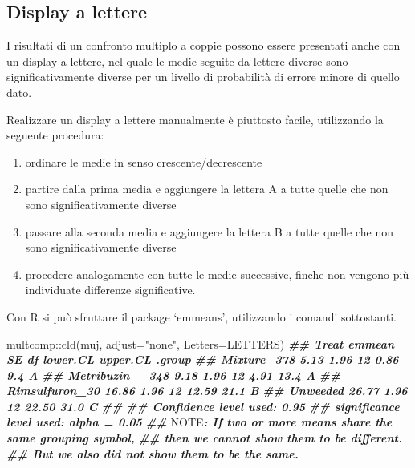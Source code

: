 \documentclass[
  12pt,
]{book}
\newenvironment{Shaded}{\begin{snugshade}}{\end{snugshade}}
\newcommand{\AlertTok}[1]{\textcolor[rgb]{0.94,0.16,0.16}{#1}}
\newcommand{\AttributeTok}[1]{\textcolor[rgb]{0.77,0.63,0.00}{#1}}
\newcommand{\DocumentationTok}[1]{\textcolor[rgb]{0.56,0.35,0.01}{\textbf{\textit{#1}}}}
\newcommand{\FunctionTok}[1]{\textcolor[rgb]{0.00,0.00,0.00}{#1}}
\newcommand{\NormalTok}[1]{#1}
\newcommand{\SpecialCharTok}[1]{\textcolor[rgb]{0.00,0.00,0.00}{#1}}
\newcommand{\StringTok}[1]{\textcolor[rgb]{0.31,0.60,0.02}{#1}}
\providecommand{\tightlist}{%
  \setlength{\itemsep}{0pt}\setlength{\parskip}{0pt}}
\begin{document}
\hypertarget{display-a-lettere}{%
\subsection{Display a lettere}\label{display-a-lettere}}

I risultati di un confronto multiplo a coppie possono essere presentati anche con un display a lettere, nel quale le medie seguite da lettere diverse sono significativamente diverse per un livello di probabilità di errore minore di quello dato.

Realizzare un display a lettere manualmente è piuttosto facile, utilizzando la seguente procedura:

\begin{enumerate}
\def\labelenumi{\arabic{enumi}.}
\tightlist
\item
  ordinare le medie in senso crescente/decrescente
\item
  partire dalla prima media e aggiungere la lettera A a tutte quelle che non sono significativamente diverse
\item
  passare alla seconda media e aggiungere la lettera B a tutte quelle che non sono significativamente diverse
\item
  procedere analogamente con tutte le medie successive, finche non vengono più individuate differenze significative.
\end{enumerate}

Con R si può sfruttare il package `emmeans', utilizzando i comandi sottostanti.

\begin{Shaded}
\begin{Highlighting}[]
\NormalTok{multcomp}\SpecialCharTok{::}\FunctionTok{cld}\NormalTok{(muj, }\AttributeTok{adjust=}\StringTok{"none"}\NormalTok{, }\AttributeTok{Letters=}\NormalTok{LETTERS)}
\DocumentationTok{\#\#  Treat           emmean   SE df lower.CL upper.CL .group}
\DocumentationTok{\#\#  Mixture\_378       5.13 1.96 12     0.86      9.4  A    }
\DocumentationTok{\#\#  Metribuzin\_\_348   9.18 1.96 12     4.91     13.4  A    }
\DocumentationTok{\#\#  Rimsulfuron\_30   16.86 1.96 12    12.59     21.1   B   }
\DocumentationTok{\#\#  Unweeded         26.77 1.96 12    22.50     31.0    C  }
\DocumentationTok{\#\# }
\DocumentationTok{\#\# Confidence level used: 0.95 }
\DocumentationTok{\#\# significance level used: alpha = 0.05 }
\DocumentationTok{\#\# }\AlertTok{NOTE}\DocumentationTok{: If two or more means share the same grouping symbol,}
\DocumentationTok{\#\#       then we cannot show them to be different.}
\DocumentationTok{\#\#       But we also did not show them to be the same.}
\end{Highlighting}
\end{Shaded}
\end{document}
